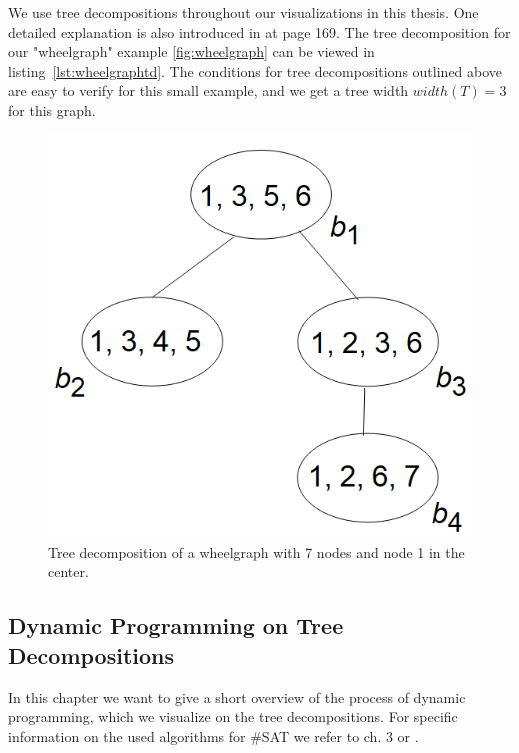 \documentclass[a4paper, 12pt, bibliography=totoc]{scrartcl}
\begin{document}
We use tree decompositions throughout our visualizations in this thesis. One detailed explanation is also introduced in \cite{pcgp2019} at page 169.
The tree decomposition for our "wheelgraph" example \ref{fig:wheelgraph} can be viewed in listing~\ref{lst:wheelgraphtd}. The conditions for tree decompositions outlined above are easy to verify for this small example, and we get a tree width $width(T)=3$ for this graph.

\begin{figure}[H]
	\includegraphics[]{images/TDWheelgraph7.png}
	\caption{Tree decomposition of a wheelgraph with 7 nodes and node 1 in the center.}
	\label{fig:tdweelgraph7}
\end{figure}

\subsection{Dynamic Programming on Tree Decompositions}
In this chapter we want to give a short overview of the process of dynamic programming, which we visualize on the tree decompositions. For specific information on the used algorithms for \#SAT we refer to \cite{DiplomarbeitZisser} ch. 3 or \cite{samermodelcounting}. \\
\end{document}
